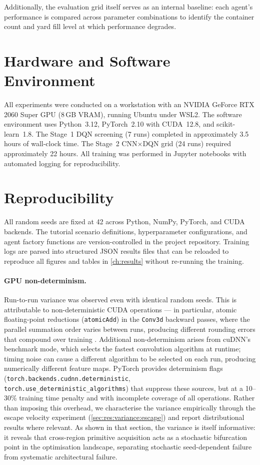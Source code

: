 Additionally, the evaluation grid itself serves as an internal baseline: each agent's performance is compared across parameter combinations to identify the container count and yard fill level at which performance degrades.

\section{Hardware and Software Environment}
\label{sec:exp:hardware}

All experiments were conducted on a workstation with an NVIDIA GeForce RTX 2060 Super GPU (8\,GB VRAM), running Ubuntu under WSL2. The software environment uses Python~3.12, PyTorch~2.10 with CUDA~12.8, and scikit-learn~1.8. The Stage~1 DQN screening (7 runs) completed in approximately 3.5 hours of wall-clock time. The Stage~2 CNN$\times$DQN grid (24 runs) required approximately 22 hours. All training was performed in Jupyter notebooks with automated logging for reproducibility.

\section{Reproducibility}
\label{sec:exp:reproducibility}

All random seeds are fixed at 42 across Python, NumPy, PyTorch, and CUDA backends. The tutorial scenario definitions, hyperparameter configurations, and agent factory functions are version-controlled in the project repository. Training logs are parsed into structured JSON results files that can be reloaded to reproduce all figures and tables in \cref{ch:results} without re-running the training.

\paragraph{GPU non-determinism.}
Run-to-run variance was observed even with identical random seeds. This is attributable to non-deterministic CUDA operations --- in particular, atomic floating-point reductions (\texttt{atomicAdd}) in the \texttt{Conv3d} backward passes, where the parallel summation order varies between runs, producing different rounding errors that compound over training \cite{pytorch_reproducibility}. Additional non-determinism arises from cuDNN's benchmark mode, which selects the fastest convolution algorithm at runtime; timing noise can cause a different algorithm to be selected on each run, producing numerically different feature maps. PyTorch provides determinism flags (\texttt{torch.backends.cudnn.deterministic}, \texttt{torch.use\_deterministic\_algorithms}) that suppress these sources, but at a 10--30\% training time penalty and with incomplete coverage of all operations. Rather than imposing this overhead, we characterise the variance empirically through the escape velocity experiment (\cref{sec:res:variance:escape}) and report distributional results where relevant. As shown in that section, the variance is itself informative: it reveals that cross-region primitive acquisition acts as a stochastic bifurcation point in the optimisation landscape, separating stochastic seed-dependent failure from systematic architectural failure.
